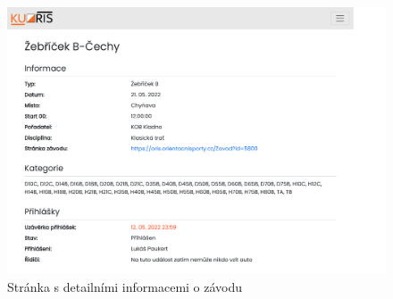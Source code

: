 \begin{figure}[h]
    \caption{Stránka s detailními informacemi o závodu}
    \centering
    \includegraphics[width=0.995\linewidth, cfbox=kuorisgray 0.5pt 0pt]{images/appendix-detail.pdf}
\end{figure}
